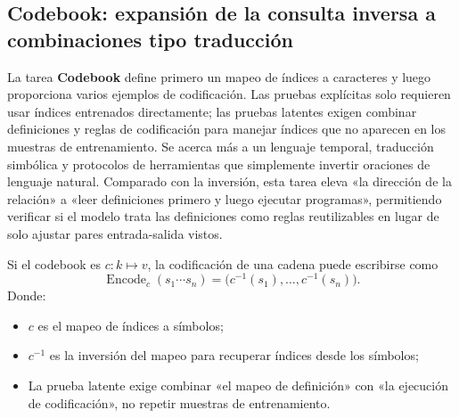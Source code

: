 
\subsection{Codebook: expansión de la consulta inversa a combinaciones tipo traducción}

La tarea \textbf{Codebook} define primero un mapeo de índices a caracteres y luego proporciona varios ejemplos de codificación. Las pruebas explícitas solo requieren usar índices entrenados directamente; las pruebas latentes exigen combinar definiciones y reglas de codificación para manejar índices que no aparecen en los muestras de entrenamiento. Se acerca más a un lenguaje temporal, traducción simbólica y protocolos de herramientas que simplemente invertir oraciones de lenguaje natural. Comparado con la inversión, esta tarea eleva «la dirección de la relación» a «leer definiciones primero y luego ejecutar programas», permitiendo verificar si el modelo trata las definiciones como reglas reutilizables en lugar de solo ajustar pares entrada-salida vistos.


Si el codebook es $c:k\mapsto v$, la codificación de una cadena puede escribirse como
$$
\operatorname{Encode}_{c}(s_1\cdots s_n)
=\bigl(c^{-1}(s_1),\ldots,c^{-1}(s_n)\bigr).
$$
Donde:
\begin{itemize}
  \item $c$ es el mapeo de índices a símbolos;
  \item $c^{-1}$ es la inversión del mapeo para recuperar índices desde los símbolos;
  \item La prueba latente exige combinar «el mapeo de definición» con «la ejecución de codificación», no repetir muestras de entrenamiento.
\end{itemize}


